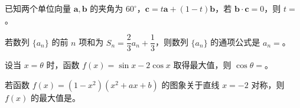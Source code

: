 \begin{question}
已知两个单位向量 $\boldsymbol a,\boldsymbol b$ 的夹角为 $60^\circ$，$\boldsymbol c=t\boldsymbol a+(1-t)\boldsymbol b$，若 $\boldsymbol b\cdot\boldsymbol c=0$，则 $t=$\gkblank{}。

\end{question}
\begin{question}
若数列 $\{a_n\}$ 的前 $n$ 项和为 $S_n=\dfrac23a_n+\dfrac13$，则数列 $\{a_n\}$ 的通项公式是 $a_n=$\gkblank{}。

\end{question}
\begin{question}
设当 $x=\theta$ 时，函数 $f(x)=\sin x-2\cos x$ 取得最大值，则 $\cos\theta=$\gkblank{}。

\end{question}
\begin{question}
若函数 $f(x)=(1-x^2)(x^2+ax+b)$ 的图象关于直线 $x=-2$ 对称，则 $f(x)$ 的最大值是\gkblank{}。

\end{question}

